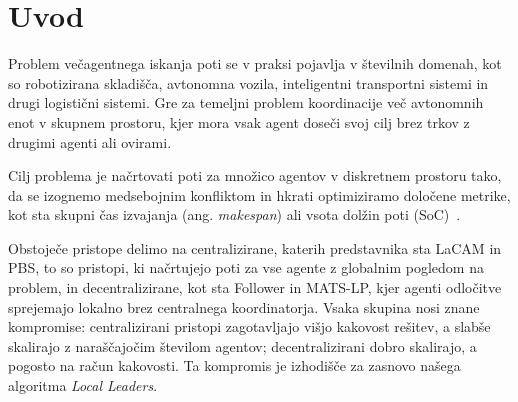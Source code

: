 \documentclass[sigconf,nonacm]{acmart}
\begin{document}
\begin{abstract}
V tem delu obravnavamo problem večagentnega iskanja poti (ang. \textit{Multi-Agent Path Finding, MAPF}) in predlagamo
nov hibridni algoritem \textit{Local Leaders}, ki združuje prednosti centraliziranega
in decentraliziranega pristopa za reševanje neprekinjenih (ang. \textit{lifelong}) MAPF problemov. Algoritem agente dinamično razporeja v lokalne
skupine, znotraj katerih vodja koordinira gibanje s prioritetno razrešitvijo
konfliktov in algoritmom A*. Predlagani pristop primerjamo s centraliziranima
algoritmoma LaCAM in PBS ter decentraliziranima algoritmoma Follower in MATS-LP na
standardiziranih zbirkah MovingAI in POGEMA\@. Rezultati kažejo, da Local
Leaders dosega primerljiv ali celo nekoliko nižji SoC (ang. \textit{Sum of Costs}) kot LaCAM (do $9\,\%$
manj pri 64 agentih), ob tem pa ohranja skoraj enako prepustnost kot MATS-LP na
odprtih okoljih (97--101\,\%) in ga bistveno prekaša na skladiščnih scenarijih.
\end{abstract}
\maketitle

\section{Uvod}

Problem večagentnega iskanja poti se v praksi pojavlja v številnih domenah, kot so robotizirana skladišča, avtonomna vozila, 
inteligentni transportni sistemi in drugi logistični sistemi. Gre za temeljni problem koordinacije 
več avtonomnih enot v skupnem prostoru, kjer mora vsak agent doseči svoj cilj brez trkov z 
drugimi agenti ali ovirami.

Cilj problema je načrtovati poti za množico agentov v diskretnem prostoru tako, da se izognemo 
medsebojnim konfliktom in hkrati optimiziramo določene metrike, kot sta skupni čas izvajanja 
(ang. \textit{makespan}) ali vsota dolžin poti (SoC)~\cite{stern2019multiagent}.

Obstoječe pristope delimo na centralizirane, katerih predstavnika sta LaCAM\cite{okumura2023lacam} in PBS\cite{li2019pbs},
to so pristopi, ki načrtujejo poti za vse agente z globalnim pogledom na problem, in decentralizirane, kot sta
Follower\cite{andreychuk2024follower} in MATS-LP\cite{skrynnik2023decentralized}, kjer agenti odločitve sprejemajo lokalno brez centralnega koordinatorja.
Vsaka skupina nosi znane kompromise: centralizirani pristopi zagotavljajo višjo kakovost rešitev,
a slabše skalirajo z naraščajočim številom agentov; decentralizirani dobro skalirajo, a pogosto
na račun kakovosti. Ta kompromis je izhodišče za zasnovo našega algoritma \textit{Local Leaders}.
\end{document}
